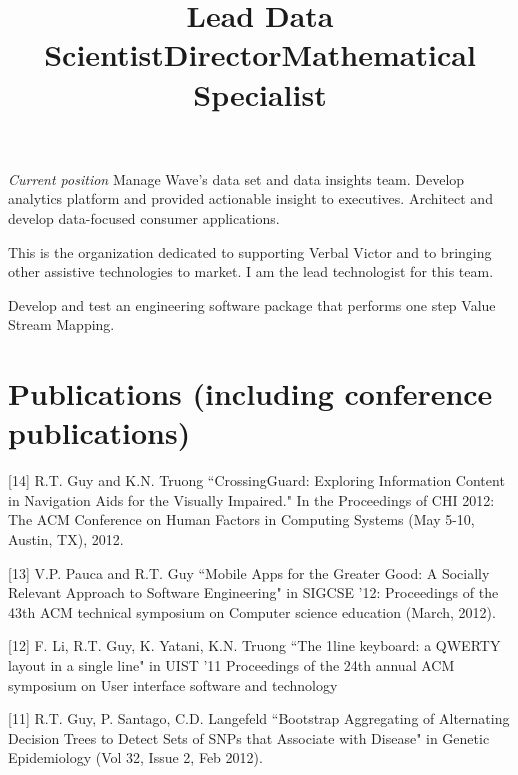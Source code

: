 \documentclass[overlapped,line,letterpaper]{res}
\begin{document}
\begin{resume}
 \title{Lead Data Scientist}
 \begin{position}
 {\em Current position }
Manage Wave’s data set and data insights team. Develop analytics platform and provided actionable insight to executives. Architect and develop data-focused consumer applications.
 \end{position}

 \title{Director}
 \begin{position}
This is the organization dedicated to supporting Verbal Victor and to bringing other assistive technologies to market. I am the lead technologist for this team.
 \end{position}

 \title{Mathematical Specialist}
 \begin{position}
    Develop and test an engineering software package that performs one step Value Stream Mapping.
 \end{position}



\section{\bf Publications (including conference publications)}

[14] R.T. Guy and K.N. Truong ``CrossingGuard: Exploring Information Content in Navigation Aids for the Visually Impaired." In the Proceedings of CHI 2012: The ACM Conference on Human Factors in Computing Systems (May 5-10, Austin, TX), 2012.

[13] V.P. Pauca and R.T. Guy ``Mobile Apps for the Greater Good: A Socially Relevant Approach to Software Engineering" in SIGCSE '12: Proceedings of the 43th ACM technical symposium on Computer science education (March, 2012).

[12] F. Li, R.T. Guy, K. Yatani, K.N. Truong ``The 1line keyboard: a QWERTY layout in a single line" in UIST '11 Proceedings of the 24th annual ACM symposium on User interface software and technology

[11] R.T. Guy, P. Santago, C.D. Langefeld ``Bootstrap Aggregating of Alternating Decision Trees to Detect Sets of SNPs that Associate with Disease" in Genetic Epidemiology (Vol 32, Issue 2, Feb 2012). 


\end{resume}
\end{document}
